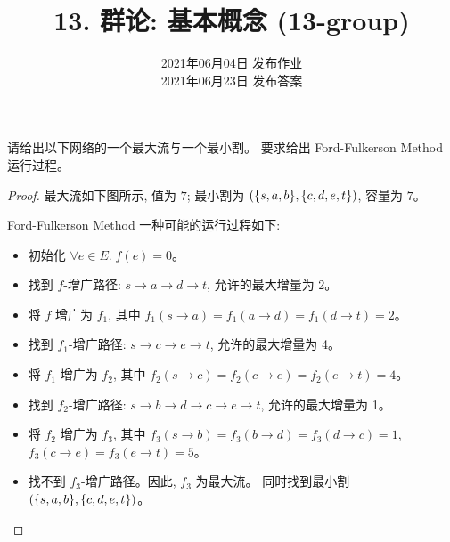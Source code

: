 \documentclass[a4paper, justified]{tufte-handout}
\title{13. 群论: 基本概念 (13-group)}
\date{2021年06月04日 发布作业 \\ 2021年06月23日 发布答案}
\begin{document}
\maketitle
\noplagiarism %
\begin{abstract}
\end{abstract}
\beginrequired

\begin{problem}
  请给出以下网络的一个最大流与一个最小割。
  要求给出 Ford-Fulkerson Method 运行过程。
\end{problem}

\begin{proof}
  最大流如下图所示, 值为 $7$;
  最小割为 $(\{s, a, b\}, \{c, d, e, t\})$, 容量为 $7$。

  Ford-Fulkerson Method 一种可能的运行过程如下:
  \begin{itemize}
    \item 初始化 $\forall e \in E.\; f(e) = 0$。
    \item 找到 $f$-增广路径: $s \to a \to d \to t$, 允许的最大增量为 2。
    \item 将 $f$ 增广为 $f_{1}$,
      其中 $f_{1}(s \to a) = f_{1}(a \to d) = f_{1}(d \to t) = 2$。
    \item 找到 $f_{1}$-增广路径: $s \to c \to e \to t$, 允许的最大增量为 4。
    \item 将 $f_{1}$ 增广为 $f_{2}$,
      其中 $f_{2}(s \to c) = f_{2}(c \to e) = f_{2}(e \to t) = 4$。
    \item 找到 $f_{2}$-增广路径: $s \to b \to d \to c \to e \to t$,
      允许的最大增量为 1。
    \item 将 $f_{2}$ 增广为 $f_{3}$,
      其中 $f_{3}(s \to b) = f_{3}(b \to d) = f_{3}(d \to c) = 1$,
      $f_{3}(c \to e) = f_{3}(e \to t) = 5$。
    \item 找不到 $f_{3}$-增广路径。因此, $f_{3}$ 为最大流。
      同时找到最小割 $(\{s, a, b\}, \{c, d, e, t\})$。
  \end{itemize}
\end{proof}
\end{document}
